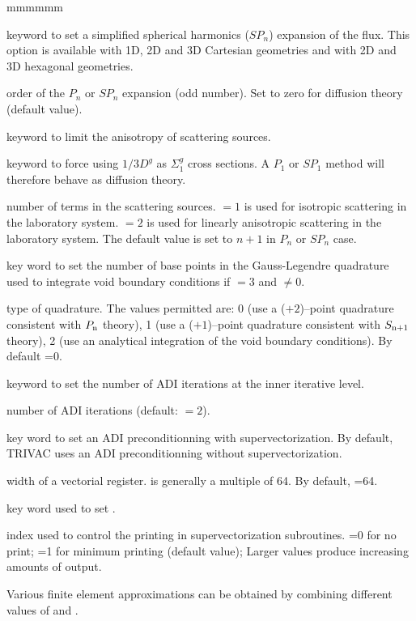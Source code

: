 \begin{ListeDeDescription}{mmmmmm}
\item[\moc{SPN}] keyword to set a simplified spherical harmonics ($SP_n$) expansion
of the flux.\cite{nse2005,ane10a} This option is available with 1D, 2D and 3D Cartesian geometries and with 2D and 3D
hexagonal geometries.

\item[\dusa{n}] order of the $P_n$ or $SP_n$ expansion (odd number). Set to zero for diffusion theory (default value).

\item[\moc{SCAT}] keyword to limit the anisotropy of scattering sources.

\item[\moc{DIFF}] keyword to force using $1/3D^{g}$ as $\Sigma_1^{g}$ cross sections. A $P_1$ or $SP_1$ method
will therefore behave as diffusion theory.

\item[\dusa{iscat}] number of terms in the scattering sources.  $=1$ is used for
isotropic scattering in the laboratory system.  $=2$ is used for
linearly anisotropic scattering in the laboratory system. The default value is set to $n+1$
in $P_n$ or $SP_n$ case.

\item[\moc{VOID}] key word to set the number of base points in the Gauss-Legendre quadrature used to integrate
void boundary conditions if  $=3$ and  $\ne 0$.

\item[\dusa{nvd}] type of quadrature. The values
permitted are: 0 (use a ($+2$)--point quadrature consistent with $P_{\rm n}$ theory),
1 (use a ($+1$)--point quadrature consistent with $S_{{\rm n}+1}$ theory),
2 (use an analytical integration of the void boundary conditions). By default =0.

\item[\moc{ADI}] keyword to set the number of ADI iterations at the inner
iterative level.

\item[\dusa{nadi}] number of ADI iterations (default:  $=2$).

\item[\moc{VECT}] key word to set an ADI preconditionning with
supervectorization. By default, TRIVAC uses an ADI preconditionning without
supervectorization.

\item[\dusa{iseg}] width of a vectorial register.  is generally a multiple of 64. By default, =64.

\item[\moc{PRTV}] key word used to set .

\item[\dusa{impv}] index used to control the  printing in supervectorization
subroutines. =0 for no print; =1 for minimum printing (default value); Larger
values produce increasing amounts of output.

\end{ListeDeDescription}

Various finite element approximations can be obtained by combining different values of
 and .

\eject
